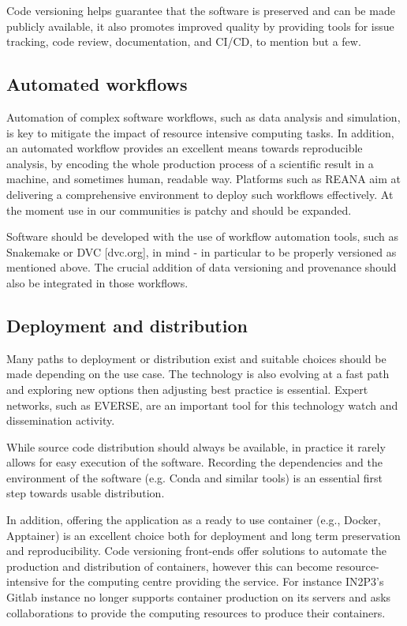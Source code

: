 Code versioning helps guarantee that the software is preserved and can be made publicly available, it also promotes improved quality by providing tools for issue tracking, code review, documentation, and CI/CD, to mention but a few. 


\subsection{Automated workflows}

Automation of complex software workflows, such as data analysis and simulation, is key to mitigate the impact of resource intensive computing tasks. In addition, an automated workflow provides an excellent means towards reproducible analysis, by encoding the whole production process of a scientific result in a machine, and sometimes human, readable way. Platforms such as REANA aim at delivering a comprehensive environment to deploy such workflows effectively. At the moment use in our communities is patchy and should be expanded.

Software should be developed with the use of workflow automation tools, such as Snakemake or DVC [dvc.org], in mind - in particular to be properly versioned as mentioned above. The crucial addition of data versioning and provenance should also be integrated in those workflows. 

\subsection{Deployment and distribution}

Many paths to deployment or distribution exist and suitable choices should be made depending on the use case. The technology is also evolving at a fast path and exploring new options then adjusting best practice is essential. Expert networks, such as EVERSE, are an important tool for this technology watch and dissemination activity. 

While source code distribution should always be available, in practice it rarely allows for easy execution of the software. Recording the dependencies and the environment of the software (e.g. Conda and similar tools) is an essential first step towards usable distribution.

In addition, offering the application as a ready to use container (e.g., Docker, Apptainer) is an excellent choice both for deployment and long term preservation and reproducibility. Code versioning front-ends offer solutions to automate the production and distribution of containers, however this can become resource-intensive for the computing centre providing the service. For instance IN2P3’s Gitlab instance no longer supports container production on its servers and asks collaborations to provide the computing resources to produce their containers.

